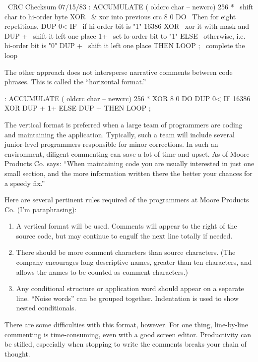 \begin{Code}
\ CRC Checksum                                      07/15/83
: ACCUMULATE   ( oldcrc char -- newcrc)
   256 *               \ shift char to hi-order byte
   XOR                 \ & xor into previous crc
   8 0 DO              \ Then for eight repetitions,
       DUP 0< IF       \ if hi-order bit is "1"
          16386 XOR    \ xor it with mask and
          DUP +        \ shift it left one place
          1+           \ set lo-order bit to "1"
              ELSE     \ otherwise, i.e. hi-order bit is "0"
          DUP +        \ shift it left one place
              THEN
       LOOP ;          \ complete the loop
\end{Code}
The other approach does not intersperse narrative comments between
code phrases.  This is called the ``horizontal format.''
\begin{Code}
: ACCUMULATE  ( oldcrc char -- newcrc)
   256 *  XOR  8 0 DO  DUP 0< IF
      16386 XOR  DUP +  1+  ELSE  DUP +  THEN  LOOP ;
\end{Code}
The vertical format is preferred when a large team of programmers are
coding and maintaining the application.  Typically, such a team will
include several junior-level programmers responsible for minor
corrections.  In such an environment, diligent commenting can save a
lot of time and upset.  As  of Moore
Products Co.  says: ``When maintaining code you are usually interested
in just one small section, and the more information written there the
better your chances for a speedy fix.''

Here are several pertinent rules required of the \Forth{} programmers
at Moore Products Co. (I'm paraphrasing):

\begin{enumerate}
\item A vertical format will be used.  Comments will appear to the
right of the source code, but may continue to engulf the next line
totally if needed.
\item There should be more comment characters than source characters.
(The company encourages long descriptive names, greater than ten
characters, and allows the names to be counted as comment characters.)
\item Any conditional structure or application word should appear on a
separate line.  ``Noise words'' can be grouped together.  Indentation
is used to show nested conditionals.
\end{enumerate}
There are some difficulties with this format, however.%
For one thing, line-by-line commenting is time-consuming, even with a
good screen editor.  Productivity can be stifled, especially when
stopping to write the comments breaks your chain of thought.

